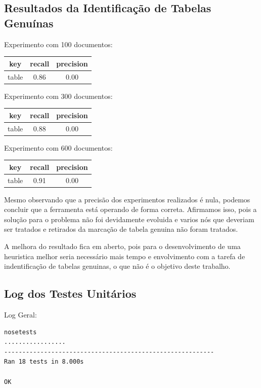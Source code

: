 \documentclass[12pt, a4paper]{article}
\begin{document}
\subsection{Resultados da Identificação de Tabelas Genuínas}
\label{ritg}

Experimento com 100 documentos:
\begin{center}
\begin{tabular}{| c | c | c |}
\hline key  & recall & precision\\
\hline table & 0.86 & 0.00\\
\hline
\end{tabular}
\end{center}

Experimento com 300 documentos:
\begin{center}
\begin{tabular}{| c | c | c |}
\hline key  & recall & precision\\
\hline table & 0.88 & 0.00\\
\hline
\end{tabular}
\end{center}

Experimento com 600 documentos:
\begin{center}
\begin{tabular}{| c | c | c |}
\hline key  & recall & precision\\
\hline table & 0.91 & 0.00\\
\hline
\end{tabular}
\end{center}

Mesmo observando que a precisão dos experimentos realizados é nula,
podemos concluir que a ferramenta está operando de forma correta.
Afirmamos isso, pois a solução para o problema não foi devidamente
evoluida e varios nós que deveriam ser tratados e retirados da marcação
de tabela genuina não foram tratados.

A melhora do resultado fica em aberto, pois para o desenvolvimento de uma
heuristica melhor seria necessário mais tempo e envolvimento com a
tarefa de indentificação de tabelas genuinas, o que não é o objetivo
deste trabalho.


\subsection{Log dos Testes Unitários}
\label{testes}

Log Geral:
\begin{verbatim}
nosetests
.................
----------------------------------------------------------
Ran 18 tests in 8.000s

OK

\end{verbatim}
\end{document}
